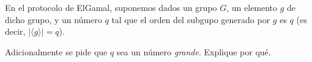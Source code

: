 
En el protocolo de ElGamal, suponemos dados un grupo $G$, un elemento $g$ de dicho grupo, y un número $q$ tal que el orden del subgupo generado por $g$ es $q$ (es decir, $|\langle g\rangle|=q$).

Adicionalmente se pide que $q$ sea un número {\it grande}. Explique por qué.
%
